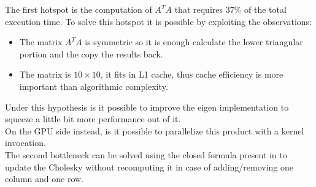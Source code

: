 The first hotspot is the computation of $A^TA$ that requires 37\% of the total execution time. To solve this hotspot it is possible by exploiting the observations:
\begin{itemize}
    \item The matrix $A^TA$ is symmetric so it is enough calculate the lower triangular portion and the copy the results back.
    \item The matrix is $10 \times 10$, it fits in L1 cache, thus cache efficiency is more important than algorithmic complexity.
\end{itemize}
Under this hypothesis is it possible to improve the eigen implementation to squeeze a little bit more performance out of it. \\
On the GPU side instead, is it possible to parallelize this product with a kernel invocation. \\
The second bottleneck can be solved using the closed formula present in \cite{wiki:Cholesky_decomposition} to update the Cholesky without recomputing it in case of adding/removing one column and one row.
